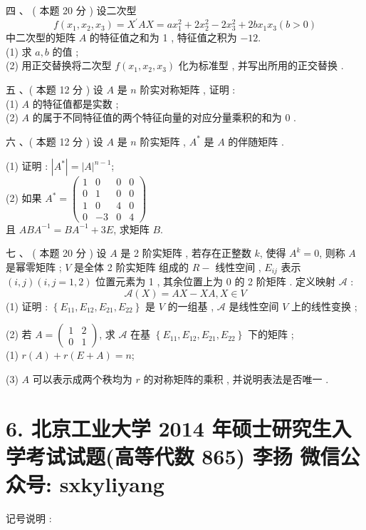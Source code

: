 \documentclass[10pt]{article}
\begin{document}
{ 四 、 ( 本题  20  分 )  设二次型 
$$
f\left(x_{1}, x_{2}, x_{3}\right)=X^{\prime} A X=a x_{1}^{2}+2 x_{2}^{2}-2 x_{3}^{2}+2 b x_{1} x_{3}(b>0)
$$
 中二次型的矩阵  $A$  的特征值之和为  1 ,  特征值之积为  $-12$.\\
(1)  求  $a, b$  的值 ;\\
(2)  用正交替换将二次型  $f\left(x_{1}, x_{2}, x_{3}\right)$  化为标准型 ,  并写出所用的正交替换 .

 五 、( 本题  12  分 )  设  $A$  是  $n$  阶实对称矩阵 ,  证明 :\\
(1) $A$  的特征值都是实数 ;\\
(2) $A$  的属于不同特征值的两个特征向量的对应分量乘积的和为  0 .

 六 、( 本题  12  分 )  设  $A$  是  $n$  阶实矩阵 , $A^{*}$  是  $A$  的伴随矩阵 .

(1)  证明 : $\left|A^{*}\right|=|A|^{n-1}$;\\
(2)  如果  $A^{*}=\left(\begin{array}{cccc}1 & 0 & 0 & 0 \\ 0 & 1 & 0 & 0 \\ 1 & 0 & 4 & 0 \\ 0 & -3 & 0 & 4\end{array}\right)$\\
 且  $A B A^{-1}=B A^{-1}+3 E$,  求矩阵  $B$.

 七 、 ( 本题  20  分 )  设  $A$  是  2  阶实矩阵 ,  若存在正整数  $k$,  使得  $A^{k}=0$,  则称  $A$  是幂零矩阵 ; $V$  是全体  2  阶实矩阵   组成的  $R-$  线性空间 , $E_{i j}$  表示  $(i, j)(i, j=1,2)$  位置元素为  1 ,  其余位置上为  0  的  2  阶矩阵 .  定义映射  $\mathscr{A}$ :
$$
\mathscr{A}(X)=A X-X A, X \in V
$$
(1)  证明 : $\left\{E_{11}, E_{12}, E_{21}, E_{22}\right\}$  是  $V$  的一组基 , $\mathscr{A}$  是线性空间  $V$  上的线性变换 ;

(2)  若  $A=\left(\begin{array}{cc}1 & 2 \\ 0 & 1\end{array}\right)$,  求  $\mathscr{A}$  在基  $\left\{E_{11}, E_{12}, E_{21}, E_{22}\right\}$  下的矩阵 ;\\
(1) $r(A)+r(E+A)=n$;

(3) $A$  可以表示成两个秩均为  $r$  的对称矩阵的乘积 ,  并说明表法是否唯一 .

\section{6. 北京工业大学 2014 年硕士研究生入学考试试题(高等代数 865) 
 李扬 
 微信公众号: sxkyliyang}
 记号说明 :

}
\end{document}
